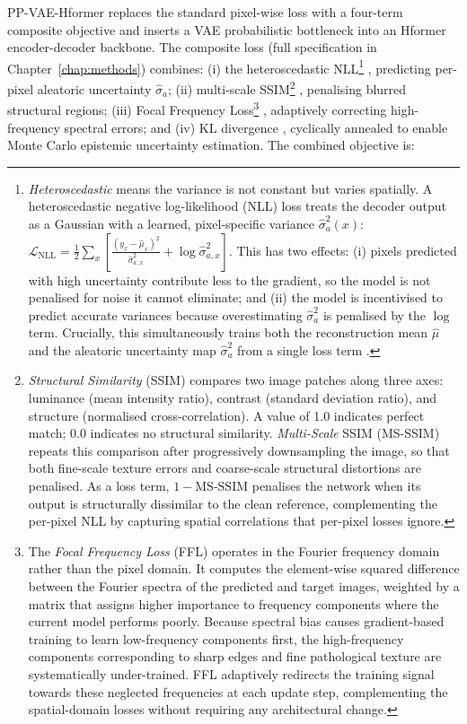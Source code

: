\documentclass[12pt, a4paper, twoside, openright]{book}
\begin{document}
PP-VAE-Hformer replaces the standard pixel-wise loss with a four-term composite objective and inserts a VAE probabilistic bottleneck into an Hformer encoder-decoder backbone. The composite loss (full specification in Chapter~\ref{chap:methods}) combines: (i) the heteroscedastic NLL\footnote{\emph{Heteroscedastic} means the variance is not constant but varies spatially. A heteroscedastic negative log-likelihood (NLL) loss treats the decoder output as a Gaussian with a learned, pixel-specific variance $\hat{\sigma}^2_a(x)$: $\mathcal{L}_\mathrm{NLL} = \frac{1}{2}\sum_x \left[\frac{(y_x - \hat{\mu}_x)^2}{\hat{\sigma}^2_{a,x}} + \log\hat{\sigma}^2_{a,x}\right]$. This has two effects: (i) pixels predicted with high uncertainty contribute less to the gradient, so the model is not penalised for noise it cannot eliminate; and (ii) the model is incentivised to predict accurate variances because overestimating $\hat{\sigma}^2_a$ is penalised by the $\log$ term. Crucially, this simultaneously trains both the reconstruction mean $\hat{\mu}$ and the aleatoric uncertainty map $\hat{\sigma}^2_a$ from a single loss term \cite{kendall_what_2017}.} \cite{kendall_what_2017}, predicting per-pixel aleatoric uncertainty $\hat{\sigma}_a$; (ii) multi-scale SSIM\footnote{\emph{Structural Similarity} (SSIM) \cite{wang_image_2004} compares two image patches along three axes: luminance (mean intensity ratio), contrast (standard deviation ratio), and structure (normalised cross-correlation). A value of 1.0 indicates perfect match; 0.0 indicates no structural similarity. \emph{Multi-Scale} SSIM (MS-SSIM) \cite{wang_multiscale_2003} repeats this comparison after progressively downsampling the image, so that both fine-scale texture errors and coarse-scale structural distortions are penalised. As a loss term, $1 - \mathrm{MS\text{-}SSIM}$ penalises the network when its output is structurally dissimilar to the clean reference, complementing the per-pixel NLL by capturing spatial correlations that per-pixel losses ignore.} \cite{wang_multiscale_2003}, penalising blurred structural regions; (iii) Focal Frequency Loss\footnote{The \emph{Focal Frequency Loss} (FFL) \cite{jiang_focal_2021} operates in the Fourier frequency domain rather than the pixel domain. It computes the element-wise squared difference between the Fourier spectra of the predicted and target images, weighted by a matrix that assigns higher importance to frequency components where the current model performs poorly. Because spectral bias causes gradient-based training to learn low-frequency components first, the high-frequency components corresponding to sharp edges and fine pathological texture are systematically under-trained. FFL adaptively redirects the training signal towards these neglected frequencies at each update step, complementing the spatial-domain losses without requiring any architectural change.} \cite{jiang_focal_2021}, adaptively correcting high-frequency spectral errors; and (iv) KL divergence \cite{kingma_auto-encoding_2014}, cyclically annealed to enable Monte Carlo epistemic uncertainty estimation. The combined objective is:
\end{document}
